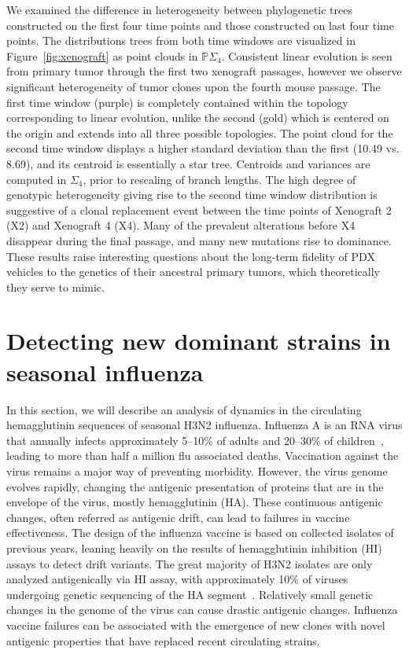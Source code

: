 \documentclass[a4paper,11pt]{article}
\begin{document}
We examined the difference in heterogeneity between phylogenetic trees constructed on the first four time points and those constructed on last four time points.
The distributions trees from both time windows are visualized in Figure~\ref{fig:xenograft} as point clouds in $\mathbb{P}\Sigma_4 $.
Consistent linear evolution is seen from primary tumor through the first two xenograft passages, however we observe significant heterogeneity of tumor clones upon the fourth mouse passage.
The first time window (purple) is completely contained within the topology corresponding to linear evolution, unlike the second (gold) which is centered on the origin and extends into all three possible topologies.
The point cloud for the second time window displays a higher standard deviation than the first (10.49 vs. 8.69), and its centroid is essentially a star tree.
Centroids and variances are computed in $\Sigma_4$, prior to rescaling of branch lengths.
The high degree of genotypic heterogeneity giving rise to the second time window distribution is suggestive of a clonal replacement event between the time points of Xenograft 2 (X2) and Xenograft 4 (X4).
Many of the prevalent alterations before X4 disappear during the final passage, and many new mutations rise to dominance.
These results raise interesting questions about the long-term fidelity of PDX vehicles to the genetics of their ancestral primary tumors, which theoretically they serve to mimic.


\section{Detecting new dominant strains in seasonal influenza}\label{sec:flu}

In this section, we will describe an analysis of dynamics in the circulating hemagglutinin sequences of seasonal H3N2 influenza.
Influenza A is an RNA virus that annually infects approximately 5--10\% of adults and 20--30\% of children~\cite{WHO}, leading to more than half a million flu associated deaths.
Vaccination against the virus remains a major way of preventing morbidity.
However, the virus genome evolves rapidly, changing the antigenic presentation of proteins that are in the envelope of the virus, mostly hemagglutinin (HA).
These continuous antigenic changes, often referred as antigenic drift, can lead to failures in vaccine effectiveness.
The design of the influenza vaccine is based on collected isolates of previous years, leaning heavily on the results of hemagglutinin inhibition (HI) assays to detect drift variants.
The great majority of H3N2 isolates are only analyzed antigenically via HI assay, with approximately 10\% of viruses undergoing genetic sequencing of the HA segment~\cite{russell2008influenza}.
Relatively small genetic changes in the genome of the virus can cause drastic antigenic changes.
Influenza vaccine failures can be associated with the emergence of new clones with novel antigenic properties that have replaced recent circulating strains.
\end{document}
